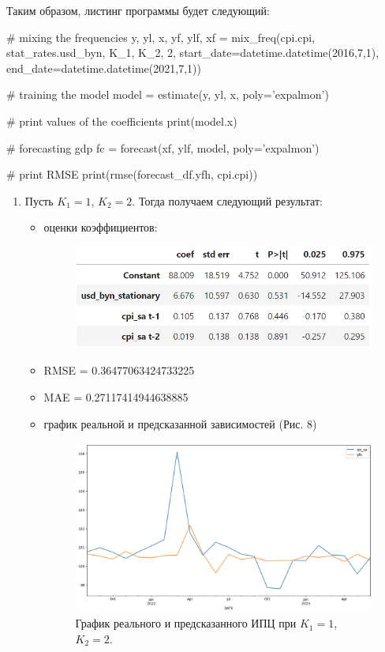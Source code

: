 \documentclass[a4paper, 12pt]{extarticle}
\begin{document}
	Таким образом, листинг программы будет следующий:
	\begin{python}
		# mixing the frequencies
		y, yl, x, yf, ylf, xf = mix_freq(cpi.cpi, stat_rates.usd_byn, K_1, K_2, 2,
		start_date=datetime.datetime(2016,7,1),
		end_date=datetime.datetime(2021,7,1))
		
		# training the model
		model = estimate(y, yl, x, poly='expalmon')
		
		# print values of the coefficients
		print(model.x)
		
		# forecasting gdp
		fc = forecast(xf, ylf, model, poly='expalmon')
		
		# print RMSE 
		print(rmse(forecast_df.yfh, cpi.cpi))\end{python}
		\begin{enumerate}
			\item Пусть $K_1 = 1$, $K_2 = 2$. Тогда получаем следующий результат:
			\begin{itemize}
				\item оценки коэффициентов:
				\begin{figure}[h!]
					\centering
					\includegraphics[scale=1.1]{images/tab_3}
					\label{fig:tab3}
				\end{figure}
				
				\item RMSE = 0.36477063424733225
				\item MAE = 0.27117414944638885
				\item график реальной и предсказанной зависимостей (Рис. 8)
				\begin{figure}[h!]
					\centering
					\includegraphics[scale=0.4]{images/pic_08}
					\caption[Рис. 8]{График реального и предсказанного ИПЦ при $K_1 = 1$, $K_2 = 2$.}
					\label{fig:pic08}
				\end{figure}
				

\end{itemize}
\end{enumerate}
\end{document}
